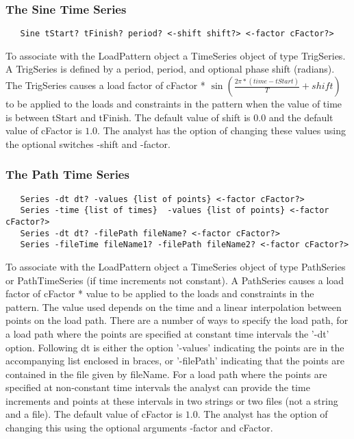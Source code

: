 \documentclass[12pt]{article}
\begin{document}
\subsubsection{The Sine Time Series}

{\sf\small
\begin{verbatim}
   Sine tStart? tFinish? period? <-shift shift?> <-factor cFactor?> 
\end{verbatim}
}

\noindent To associate with the LoadPattern object a TimeSeries object
of type TrigSeries. A TrigSeries is defined by a period, period, and optional
phase shift (radians). The TrigSeries causes a load factor of
cFactor * $\sin(\frac{2\pi*(time-tStart)}{T} + shift)$ to be applied
to the loads and constraints in the pattern when the value of time is
between tStart and tFinish. The default value of shift is $0.0$ and
the default value of cFactor is $1.0$. The analyst has the option of
changing these values using the optional switches -shift and -factor. 

\subsubsection{The Path Time Series}

{\sf\small
\begin{verbatim}
   Series -dt dt? -values {list of points} <-factor cFactor?> 
   Series -time {list of times}  -values {list of points} <-factor cFactor?> 
   Series -dt dt? -filePath fileName? <-factor cFactor?> 
   Series -fileTime fileName1? -filePath fileName2? <-factor cFactor?> 
\end{verbatim}
}

\noindent To associate with the LoadPattern object a TimeSeries object
of type PathSeries or PathTimeSeries (if time increments not
constant). A PathSeries causes a load factor of cFactor * 
value to be applied to the loads and constraints in the pattern. The value used
depends on the time and a linear interpolation between points on the
load path. There are a number of ways to specify the load path, for a load
path where the points are specified at constant time intervals the
'-dt' option. Following dt is either the option '-values' indicating the
points are in the accompanying list enclosed in braces, or '-filePath'
indicating that the points are contained in the file given by
fileName. For a load path where the points are specified at
non-constant time intervals the analyst can provide the time
increments and points at these intervals in two strings or two files
(not a string and a file). The default value of cFactor is $1.0$. The
analyst has the option of changing this using the optional arguments
-factor and cFactor. 
\end{document}
